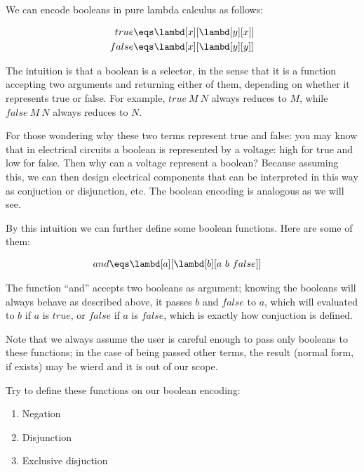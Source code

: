 \documentclass[../../../include/open-logic-section]{subfiles}
\begin{document}

We can encode booleans in pure lambda calculus as follows:

\begin{align*}
  {true} &\eqs \lambd[x][\lambd[y][x]]\\
  {false} &\eqs \lambd[x][\lambd[y][y]]
\end{align*}

The intuition is that a boolean is a selector, in the sense that it is a function accepting two arguments
and returning either of them, depending on whether it represents true or
false. For example, $true ~ M ~ N$ always reduces to $M$, while $false
~ M ~ N$ always reduces to $N$.

\begin{explain}
  For those wondering why these two terms represent true and false:
  you may know that in electrical circuits a boolean is represented by
  a voltage: high for true and low for false. Then why can a voltage
  represent a boolean? Because assuming this, we can then design
  electrical components that can be interpreted in this way as conjuction or
  disjunction, etc. The boolean encoding is analogous as we will see.
\end{explain}


By this intuition we can further define some boolean functions. Here
are some of them:

\begin{align*}
  {and} &\eqs \lambd[a][\lambd[b][a ~ b ~ {false}]]
\end{align*}

The function ``and'' accepts two booleans as argument; knowing the
booleans will always behave as described above, it passes $b$ and ${false}$
to $a$, which will evaluated to $b$ if $a$ is ${true}$, or ${false}$ if $a$ is ${false}$,
which is exactly how conjuction is defined.

Note that we always assume the user is careful enough to pass only booleans to these functions; in the
case of being passed other terms, the result (normal form, if exists)
may be wierd and it is out of our scope.

\begin{prob}
  Try to define these functions on our boolean encoding:
  \begin{enumerate}
  \item Negation
  \item Disjunction
  \item Exclusive disjuction
  \end{enumerate}
\end{prob}
\end{document}
